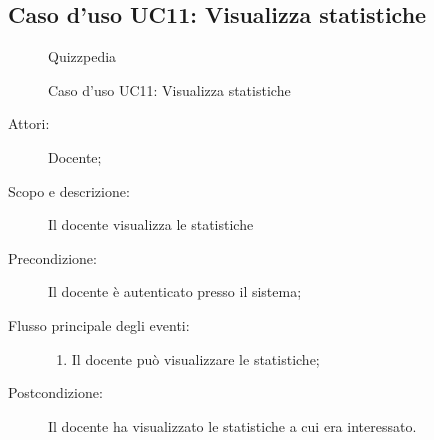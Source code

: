 \subsection{Caso d'uso UC11: Visualizza statistiche}
        \begin{figure}[H]
            \centering
            \begin{resizedtikzpicture}{\textwidth}
		\begin{umlsystem}[x=0, fill=lightgray!20]{Quizzpedia}
		\end{umlsystem}
            \end{resizedtikzpicture}
            \caption{Caso d'uso UC11: Visualizza statistiche}
            \label{fig:UC11} 
        \end{figure}
    \begin{description}
\item[Attori:] Docente;
\item[Scopo e descrizione:] Il docente visualizza le statistiche
      \item[Precondizione:] Il docente è autenticato presso il sistema;

        \item[Flusso principale degli eventi:] \begin{enumerate}
          \item Il docente può visualizzare le statistiche;

      \end{enumerate}
    \item[Postcondizione:] Il docente ha visualizzato le statistiche a cui era interessato.
  \end{description}
\hypertarget{UC12}{}
